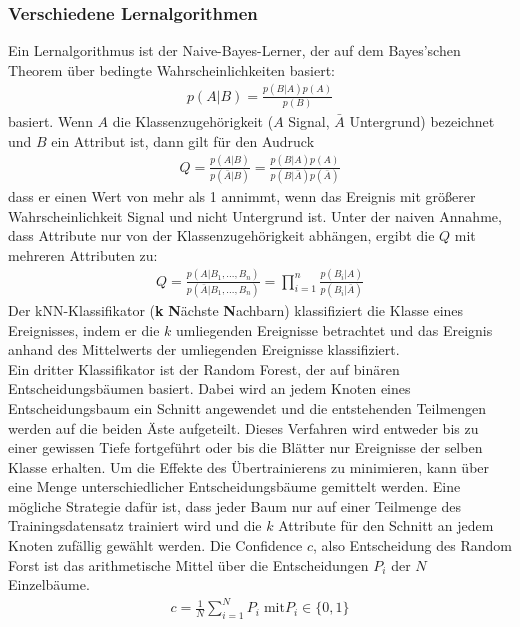 \subsubsection{Verschiedene Lernalgorithmen}
Ein Lernalgorithmus ist der Naive-Bayes-Lerner, der auf dem Bayes'schen Theorem über bedingte Wahrscheinlichkeiten basiert:
\begin{align}
	p(A|B) = \frac{p(B|A)p(A)}{p(B)}
\end{align}
basiert. Wenn $A$ die Klassenzugehörigkeit ($A$ Signal, $\bar{A}$ Untergrund) bezeichnet und $B$ ein Attribut ist, dann gilt für den Audruck
\begin{align}
	Q = \frac{p(A|B)}{p(\bar{A}|B)} = \frac{p(B|A)p(A)}{p(B|\bar{A})p(\bar{A})}
\end{align}
dass er einen Wert von mehr als 1 annimmt, wenn das Ereignis mit größerer Wahrscheinlichkeit Signal und nicht Untergrund ist. Unter der naiven Annahme, dass Attribute nur von der Klassenzugehörigkeit abhängen, ergibt die $Q$ mit mehreren Attributen zu:\\
\begin{align}
	Q = \frac{p(A|B_{1},...,B_{n})}{p(\bar{A}|B_{1},...,B_{n})} = \prod_{i=1}^{n} \frac{p(B_{i}|A)}{p(B_{i}|\bar{A})}
\end{align}
Der kNN-Klassifikator (\textbf{k} \textbf{N}ächste \textbf{N}achbarn) klassifiziert die Klasse eines Ereignisses, indem er die $k$ umliegenden Ereignisse betrachtet und das Ereignis anhand des Mittelwerts der umliegenden Ereignisse klassifiziert.\\
Ein dritter Klassifikator ist der Random Forest, der auf binären Entscheidungsbäumen basiert. Dabei wird an jedem Knoten eines Entscheidungsbaum ein Schnitt angewendet und die entstehenden Teilmengen werden auf die beiden Äste aufgeteilt. Dieses Verfahren wird entweder bis zu einer gewissen Tiefe fortgeführt oder bis die Blätter nur Ereignisse der selben Klasse erhalten. Um die Effekte des Übertrainierens zu minimieren, kann über eine Menge unterschiedlicher Entscheidungsbäume gemittelt werden. Eine mögliche Strategie dafür ist, dass jeder Baum nur auf einer Teilmenge des Trainingsdatensatz trainiert wird und die $k$ Attribute für den Schnitt an jedem Knoten zufällig gewählt werden. Die Confidence $c$, also Entscheidung des Random Forst ist das arithmetische Mittel über die Entscheidungen $P_{i}$ der $N$ Einzelbäume.
\begin{align}
	c = \frac{1}{N} \sum_{i=1}^{N}P_{i} \; \text{mit} P_{i} \in \{0,1\}
\end{align}
